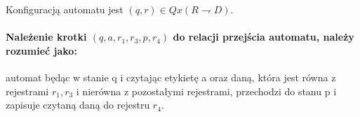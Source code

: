 \documentclass[a4paper,12pt]{report}
\begin{document}
Konfiguracją automatu jest $(q,r) \in Q x (R \rightharpoondown D)$.

\paragraph {Należenie krotki $(q,a,r_1,r_3,p,r_4)$ do relacji przejścia automatu, należy rozumieć jako:} automat będąc w stanie q i czytając etykietę a oraz daną, która jest równa z rejestrami $r_1,r_3$ i nierówna z pozostałymi rejestrami, przechodzi do stanu p i zapisuje czytaną daną do rejestru $r_4$.
\end{document}
